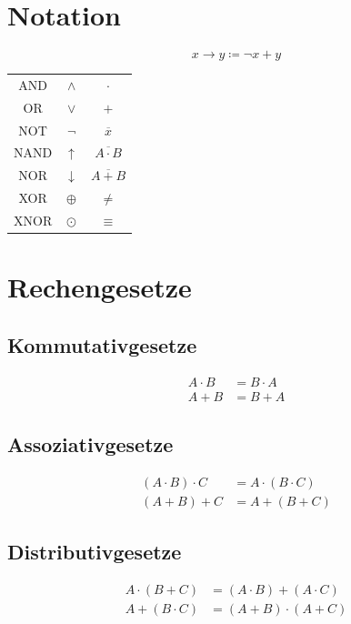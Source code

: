 \documentclass[a4paper,6pt]{article}
\begin{document}
\begin{multicols*}{3}

\section{Notation}
\scriptsize
$$
x \rightarrow y \coloneqq \neg x + y
$$
\begin{center}
\begin{tabular}{c|c|c}
\hline
AND & $\land$ & $\cdot$\\
OR & $\lor$ & $+$ \\
NOT & $\lnot$ & $\overline{x}$ \\
NAND & $\uparrow$ & $\overline{A \cdot B}$ \\
NOR & $\downarrow$ & $\overline{A + B}$ \\
XOR & $\oplus$ & $\neq$ \\
XNOR & $\odot$ & $\equiv$ \\
\hline
\end{tabular}
\end{center}


\section*{Rechengesetze}

\subsection*{Kommutativgesetze}
\begin{align*}
A \cdot B & = B \cdot A \\
A + B & = B + A
\end{align*}

\subsection*{Assoziativgesetze}
\begin{align*}
(A \cdot B) \cdot C & = A \cdot (B \cdot C) \\
(A + B) + C & = A + (B + C)
\end{align*}

\subsection*{Distributivgesetze}
\begin{align*}
A \cdot (B + C) & = (A \cdot B) + (A \cdot C) \\
A + (B \cdot C) & = (A + B) \cdot (A + C)
\end{align*}


\end{multicols*}
\end{document}
